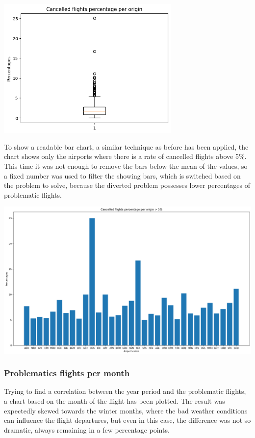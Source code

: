 \documentclass[
	letterpaper, %
	10pt, %
]{class}
\begin{document}
\begin{center}
    \includegraphics[width=9cm]{../images/cancelled_box_per_origin.png}
\end{center}

To show a readable bar chart, a similar technique as before has been applied, the chart shows only the airports where there is a rate of cancelled flights above 5\%. This time it was not enough to remove the bars below the mean of the values, so a fixed number was used to filter the showing bars, which is switched based on the problem to solve,
because the diverted problem possesses lower percentages of problematic flights.

\begin{center}
    \includegraphics[width=14cm]{../images/cancelled_per_origin.png}
\end{center}
\newpage

\subsubsection{Problematics flights per month}
Trying to find a correlation between the year period and the problematic flights, a chart based on the month of the flight has been plotted. The result was expectedly skewed towards the winter months, where the bad weather conditions can influence the flight departures, but even in this case, the difference was not so dramatic, always remaining in a few percentage points.
\end{document}
